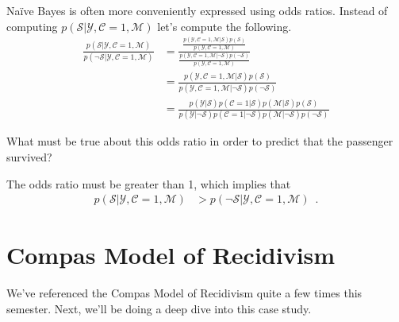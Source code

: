 \documentclass[assignment02_Solutions]{subfiles}
\begin{document}
\begin{exercise}[(45 minutes)]
\item Na\"ive Bayes is often more conveniently expressed using odds ratios.  Instead of computing $p(\mathcal{S}|\mathcal{Y}, \mathcal{C}=1, \mathcal{M})$ let's compute the following.
\begin{align}
\frac{p(\mathcal{S}|\mathcal{Y}, \mathcal{C}=1, \mathcal{M})}{p(\neg \mathcal{S}|\mathcal{Y}, \mathcal{C}=1, \mathcal{M})} &= \frac{\frac{p(\mathcal{Y}, \mathcal{C}=1, \mathcal{M} | \mathcal{S})p(\mathcal{S})}{p(\mathcal{Y},\mathcal{C}=1, \mathcal{M})}}{\frac{p(\mathcal{Y}, \mathcal{C}=1, \mathcal{M} | \neg \mathcal{S})p(\neg \mathcal{S})}{p(\mathcal{Y},\mathcal{C}=1, \mathcal{M})}} \nonumber \\
&=  \frac{p(\mathcal{Y}, \mathcal{C}=1, \mathcal{M} | \mathcal{S})p(\mathcal{S})}{p(\mathcal{Y}, \mathcal{C}=1, \mathcal{M} | \neg \mathcal{S})p(\neg \mathcal{S})} \nonumber \\
&= \frac{p(\mathcal{Y} | \mathcal{S}) p(\mathcal{C}=1 | \mathcal{S}) p(\mathcal{M} | \mathcal{S})p(\mathcal{S})}{p(\mathcal{Y}| \neg \mathcal{S}) p(\mathcal{C}=1 | \neg \mathcal{S}) p(\mathcal{M} | \neg \mathcal{S})p(\neg \mathcal{S})} \nonumber
\end{align}

What must be true about this odds ratio in order to predict that the passenger survived?
\begin{boxedsolution}
The odds ratio must be greater than 1, which implies that
\begin{align}
p(\mathcal{S}|\mathcal{Y}, \mathcal{C}=1, \mathcal{M}) &> p(\neg \mathcal{S}|\mathcal{Y}, \mathcal{C}=1, \mathcal{M}) \enspace . \nonumber
\end{align}
\end{boxedsolution}

\ees
\end{exercise}



\section{Compas Model of Recidivism}

We've referenced the Compas Model of Recidivism quite a few times this semester.  Next, we'll be doing a deep dive into this case study.
\end{document}
